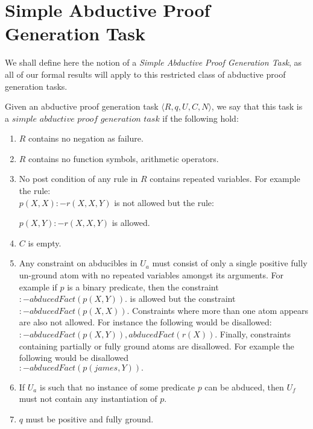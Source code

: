 \section{Simple Abductive Proof Generation Task}

We shall define here the notion of a
\textit{Simple Abductive Proof Generation Task}, as all of our formal results
will apply to this restricted class of abductive proof generation tasks.

\begin{definition}\label{simpletask}
Given an abductive proof generation task $\langle R,q,U,C,N \rangle$, we say that this task is a $\textit{simple abductive proof generation task}$ if the following hold:
\begin{enumerate}
\item $R$ contains no negation as failure.
\item $R$ contains no function symbols, arithmetic operators.
\item No post condition of any rule in $R$ contains repeated variables. For example the rule:\\
$p(X,X):-r(X,X,Y)$ is not allowed but the rule: 

$p(X,Y):-r(X,X,Y)$ is allowed.
\item $C$ is empty.
\item Any constraint on abducibles in $U_{a}$ must consist of only a single
  positive fully un-ground atom with no repeated variables amongst its
  arguments. For example if $p$ is a binary predicate, then the constraint
  $:-abducedFact(p(X,Y)).$ is allowed but the constraint
  $:-abducedFact(p(X,X)).$ Constraints where more than one atom appears are
  also not allowed. For instance the following would be disallowed:
  $:-abducedFact(p(X,Y)),abducedFact(r(X)).$ Finally, constraints containing
  partially or fully ground atoms are disallowed. For example the following
  would be disallowed\\ $:-abducedFact(p(james,Y)).$
\item If $U_{a}$ is such that no instance of some predicate $p$ can be
  abduced, then $U_{f}$ must not contain any instantiation of $p$.
\item $q$ must be positive and fully ground.
\end{enumerate}
\end{definition}



